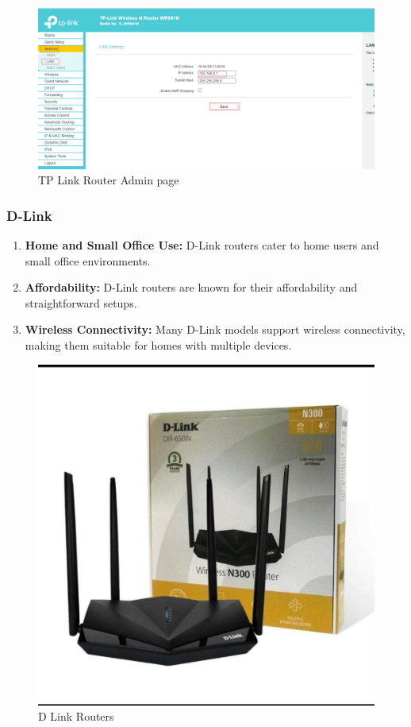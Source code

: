 \documentclass[11pt]{article}
\begin{document}
\begin{figure}[H]
  \centering
  \includegraphics[width=.95\textwidth]{tp link admin page/tp link admin page_6.jpg}
  \caption{TP Link Router Admin page}
\end{figure}

\subsubsection{D-Link}
\begin{enumerate}
  \item \textbf{Home and Small Office Use:} D-Link routers cater to home users and small office environments.

  \item \textbf{Affordability:} D-Link routers are known for their affordability and straightforward setups.

  \item \textbf{Wireless Connectivity:} Many D-Link models support wireless connectivity, making them suitable for homes with multiple devices.
\end{enumerate}

\begin{figure}[H]
  \centering
  \includegraphics[width=.45\textwidth]{d link router/d link router_1.jpg}
  \caption{D Link Routers}
\end{figure}
\end{document}
